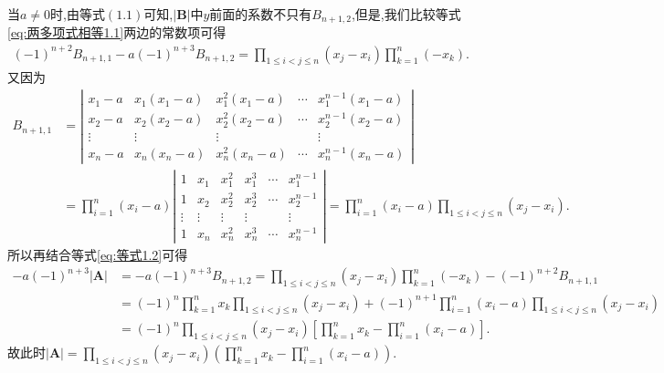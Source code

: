 \documentclass[lang=cn,newtx,10pt,scheme=chinese]{elegantbook}
\begin{document}
\begin{solution}
当\(a\neq 0\)时,由等式\((1.1)\)可知,\(|\boldsymbol{B}|\)中\(y\)前面的系数不只有\(B_{n + 1,2}\),但是,我们比较等式\eqref{eq:两多项式相等1.1}两边的常数项可得
\begin{align}\label{eq:等式1.2}
(-1)^{n + 2}B_{n + 1,1}-a(-1)^{n + 3}B_{n + 1,2}=\prod_{1\leqslant i < j\leqslant n}(x_j - x_i)\prod_{k = 1}^{n}(-x_k).
\end{align}
又因为
\begin{align*}
B_{n + 1,1}&=\left|\begin{matrix}
x_1 - a & x_1(x_1 - a) & x_{1}^{2}(x_1 - a) & \cdots & x_{1}^{n - 1}(x_1 - a)\\
x_2 - a & x_2(x_2 - a) & x_{2}^{2}(x_2 - a) & \cdots & x_{2}^{n - 1}(x_2 - a)\\
\vdots & \vdots & \vdots &  & \vdots\\
x_n - a & x_n(x_n - a) & x_{n}^{2}(x_n - a) & \cdots & x_{n}^{n - 1}(x_n - a)
\end{matrix}\right|
\\
&=\prod_{i = 1}^{n}(x_i - a)\left|\begin{matrix}
1 & x_1 & x_{1}^{2} & x_{1}^{3} & \cdots & x_{1}^{n - 1}\\
1 & x_2 & x_{2}^{2} & x_{2}^{3} & \cdots & x_{2}^{n - 1}\\
\vdots & \vdots & \vdots & \vdots &  & \vdots\\
1 & x_n & x_{n}^{2} & x_{n}^{3} & \cdots & x_{n}^{n - 1}
\end{matrix}\right|=\prod_{i = 1}^{n}(x_i - a)\prod_{1\leqslant i < j\leqslant n}(x_j - x_i).
\end{align*}
所以再结合等式\eqref{eq:等式1.2}可得
\begin{align*}
-a(-1)^{n + 3}|\boldsymbol{A}|&=-a(-1)^{n + 3}B_{n + 1,2}=\prod_{1\leqslant i < j\leqslant n}(x_j - x_i)\prod_{k = 1}^{n}(-x_k)-(-1)^{n + 2}B_{n + 1,1}
\\
&=(-1)^n\prod_{k = 1}^{n}x_k\prod_{1\leqslant i < j\leqslant n}(x_j - x_i)+(-1)^{n + 1}\prod_{i = 1}^{n}(x_i - a)\prod_{1\leqslant i < j\leqslant n}(x_j - x_i)
\\
&=(-1)^n\prod_{1\leqslant i < j\leqslant n}(x_j - x_i)\left[\prod_{k = 1}^{n}x_k-\prod_{i = 1}^{n}(x_i - a)\right].
\end{align*}
故此时\(|\boldsymbol{A}|=\prod_{1\leqslant i < j\leqslant n}(x_j - x_i)\left(\prod_{k = 1}^{n}x_k-\prod_{i = 1}^{n}(x_i - a)\right)\).
\end{solution}
\end{document}
